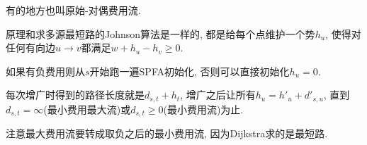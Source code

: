 有的地方也叫原始-对偶费用流.

原理和求多源最短路的Johnson算法是一样的, 都是给每个点维护一个势$h_u$, 使得对任何有向边$u\to v$都满足$w + h_u - h_v \ge 0$.

如果有负费用则从$s$开始跑一遍SPFA初始化, 否则可以直接初始化$h_u = 0$.

每次增广时得到的路径长度就是$d_{s, t} + h_t$, 增广之后让所有$h_u = h'_u + d'_{s, u}$, 直到$d_{s, t} = \infty$(最小费用最大流)或$d_{s, t} \ge 0$(最小费用流)为止.

注意最大费用流要转成取负之后的最小费用流, 因为Dijkstra求的是最短路.

\inputminted{cpp}{../src/graph/dijkstra费用流.cpp}